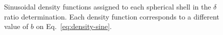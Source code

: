 \documentclass[extra, referee]{gji}
\begin{document}
\begin{figure}
\centering
{}
\caption{
    Sinusoidal density functions assigned to each spherical shell in the $\delta$ ratio
    determination.
    Each density function corresponds to a different value of $b$ on
    Eq.~\ref{eq:density-sine}.
}
\label{fig:sine-densities}
\end{figure}
\end{document}
